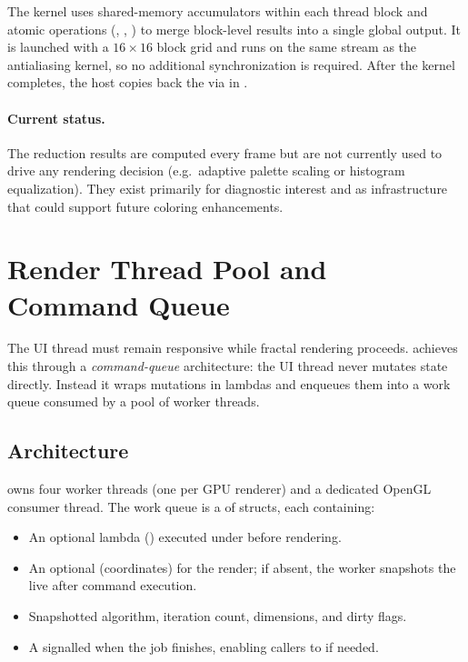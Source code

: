 The kernel uses shared-memory accumulators within each thread block
and atomic operations (, ,
) to merge block-level results into a single global
output.  It is launched with a $16\times16$ block grid and runs on
the same stream as the antialiasing kernel, so no additional
synchronization is required.  After the kernel completes, the host
copies back the  via  in
.

\paragraph{Current status.}
The reduction results are computed every frame but are not currently
used to drive any rendering decision (e.g.\ adaptive palette scaling
or histogram equalization).  They exist primarily for diagnostic
interest and as infrastructure that could support future coloring
enhancements.


\section{Render Thread Pool and Command Queue}
\label{sec:render-thread-pool}

The UI thread must remain responsive while fractal rendering proceeds.
\FractalShark{} achieves this through a \emph{command-queue} architecture:
the UI thread never mutates  state directly.  Instead it wraps
mutations in lambdas and enqueues them into a work queue consumed by a pool of
worker threads.

\subsection{Architecture}

 owns four worker threads (one per GPU renderer) and a
dedicated OpenGL consumer thread.  The work queue is a  of
 structs, each containing:

\begin{itemize}
  \item An optional  lambda ()
        executed under  before rendering.
  \item An optional  (coordinates) for the render; if absent, the
        worker snapshots the live  after command execution.
  \item Snapshotted algorithm, iteration count, dimensions, and dirty flags.
  \item A  signalled when the job finishes, enabling
        callers to  if needed.
\end{itemize}

